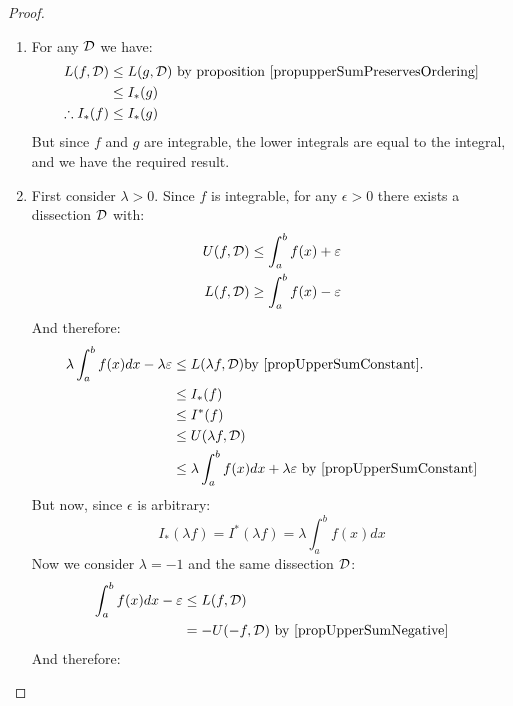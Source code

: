\documentclass[../Main.tex]{subfiles}
\begin{document}
\begin{proof}
    \begin{enumerate}
    	\item For any $\mathcal{D}$ we have:
            \begin{align*}
                L(f, \mathcal{D}) &\leq L(g, \mathcal{D}) \text{ by proposition~\ref{propupperSumPreservesOrdering}} \\
                &\leq I_*(g) \\
                \therefore I_*(f) &\leq I_*(g)
            \end{align*}
            But since $f$ and $g$ are integrable, the lower integrals are equal to the integral, and we have the required result.
        \item First consider $\lambda > 0$. Since $f$ is integrable, for any $\epsilon > 0$ there exists a dissection $\mathcal{D}$ with:
            \begin{align*}
                U(f, \mathcal{D}) &\leq \int_a^b f(x) + \varepsilon \\
                L(f, \mathcal{D}) &\geq \int_a^b f(x) - \varepsilon
            \end{align*}
            And therefore:
            \begin{align*}
                \lambda \int_a^b f(x) dx - \lambda \varepsilon &\leq L(\lambda f, \mathcal{D}) \text{by \ref{propUpperSumConstant}.} \\
                &\leq I_*(f) \\
                &\leq I^*(f) \\
                &\leq U(\lambda f, \mathcal{D}) \\
                &\leq \lambda \int_a^b f(x) dx + \lambda \varepsilon \text{ by \ref{propUpperSumConstant}}
            \end{align*}
            But now, since $\epsilon$ is arbitrary:
            \begin{equation*}
                I_*(\lambda f) = I^*(\lambda f) = \lambda \int_a^b f(x) dx
            \end{equation*}
            Now we consider $\lambda = -1$ and the same dissection $\mathcal{D}$:
            \begin{align*}
                \int_a^b f(x) dx - \varepsilon &\leq L(f, \mathcal{D}) \\
                &= -U(-f, \mathcal{D}) \text{ by \ref{propUpperSumNegative}}
            \end{align*}
            And therefore:
            \begin{equation*}

\end{equation*}
\end{enumerate}
\end{proof}
\end{document}
